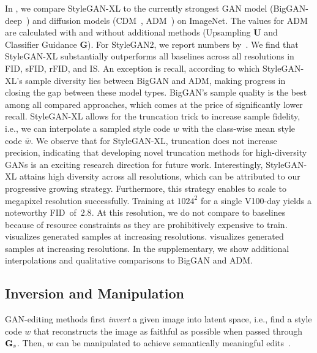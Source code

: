 In , we compare StyleGAN-XL to the currently strongest GAN model (BigGAN-deep~\cite{Brock2019ICLR}) and diffusion models (CDM~\cite{Ho2022JMLR}, ADM~\cite{Dhariwal2021NEURIPS}) on ImageNet.
The values for ADM are calculated with and without additional methods (Upsampling \textbf{U} and Classifier Guidance \textbf{G}). For StyleGAN2, we report numbers by~\cite{Grigoryev2022ICLR}.
We find that StyleGAN-XL substantially outperforms all baselines across all resolutions in FID, sFID, rFID, and IS. 
An exception is recall, according
to which StyleGAN-XL’s sample diversity lies between BigGAN and
ADM, making progress in closing the gap between these model types.
BigGAN's sample quality is the best among all compared approaches, which comes at the price of significantly lower recall. 
StyleGAN-XL allows for the truncation trick to increase sample fidelity, i.e., we can interpolate a sampled style code $w$ with the class-wise mean style code $\bar{w}$.
We observe that for StyleGAN-XL, truncation does not increase precision, indicating that developing novel truncation methods for high-diversity GANs is an exciting research direction for future work.
Interestingly, StyleGAN-XL attains high diversity across all resolutions, which can be attributed to our progressive growing strategy. Furthermore, this strategy enables to scale to megapixel resolution successfully. Training at $1024^2$ for a single V100-day yields a noteworthy FID~of~$2.8$. At this resolution, we do not compare to baselines 
because of resource constraints as they are prohibitively expensive to train. 
visualizes generated samples at increasing resolutions.
 visualizes generated samples at increasing resolutions. In the supplementary, we show additional  interpolations and qualitative comparisons to BigGAN and ADM.
\sotapr
\highres

\subsection{Inversion and Manipulation}
GAN-editing methods first \textit{invert} a given image into latent space, i.e., find a style code $w$ that reconstructs the image as faithful as possible when passed through $\mathbf{G}_s$. Then, $w$ can be manipulated to achieve semantically meaningful edits~\cite{Goetschalckx2019ICCV,Shen2020TPAMI}.


